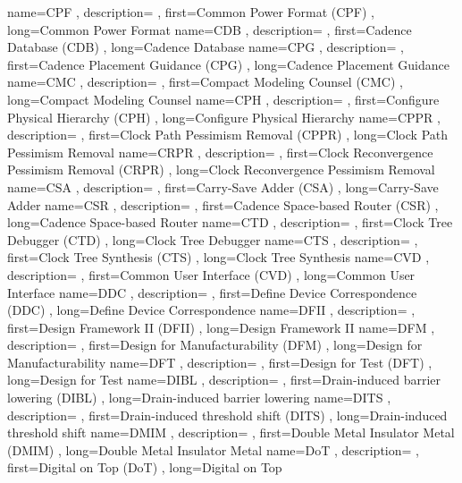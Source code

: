 { name={CPF}
, description={}
, first={Common Power Format (CPF)}
, long={Common Power Format}
}
{ name={CDB}
, description={}
, first={Cadence Database (CDB)}
, long={Cadence Database}
}
{ name={CPG}
, description={}
, first={Cadence Placement Guidance (CPG)}
, long={Cadence Placement Guidance}
}
{ name={CMC}
, description={}
, first={Compact Modeling Counsel (CMC)}
, long={Compact Modeling Counsel}
}
{ name={CPH}
, description={}
, first={Configure Physical Hierarchy (CPH)}
, long={Configure Physical Hierarchy}
}
{ name={CPPR}
, description={}
, first={Clock Path Pessimism Removal (CPPR)}
, long={Clock Path Pessimism Removal}
}
{ name={CRPR}
, description={}
, first={Clock Reconvergence Pessimism Removal (CRPR)}
, long={Clock Reconvergence Pessimism Removal}
}
{ name={CSA}
, description={}
, first={Carry-Save Adder (CSA)}
, long={Carry-Save Adder}
}
{ name={CSR}
, description={}
, first={Cadence Space-based Router (CSR)}
, long={Cadence Space-based Router}
}
{ name={CTD}
, description={}
, first={Clock Tree Debugger (CTD)}
, long={Clock Tree Debugger}
}
{ name={CTS}
, description={}
, first={Clock Tree Synthesis (CTS)}
, long={Clock Tree Synthesis}
}
{ name={CVD}
, description={}
, first={Common User Interface (CVD)}
, long={Common User Interface}
}
{ name={DDC}
, description={}
, first={Define Device Correspondence (DDC)}
, long={Define Device Correspondence}
}
{ name={DFII}
, description={}
, first={Design Framework II (DFII)}
, long={Design Framework II}
}
{ name={DFM}
, description={}
, first={Design for Manufacturability (DFM)}
, long={Design for Manufacturability}
}
{ name={DFT}
, description={}
, first={Design for Test (DFT)}
, long={Design for Test}
}
{ name={DIBL}
, description={}
, first={Drain-induced barrier lowering (DIBL)}
, long={Drain-induced barrier lowering}
}
{ name={DITS}
, description={}
, first={Drain-induced threshold shift (DITS)}
, long={Drain-induced threshold shift}
}
{ name={DMIM}
, description={}
, first={Double Metal Insulator Metal (DMIM)}
, long={Double Metal Insulator Metal}
}
{ name={DoT}
, description={}
, first={Digital on Top (DoT)}
, long={Digital on Top}
}
